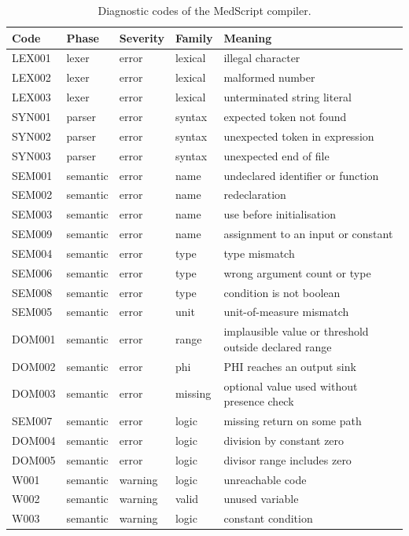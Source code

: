 \documentclass[conference]{IEEEtran}
\begin{document}
\begin{table}[t]
\centering
\caption{Diagnostic codes of the MedScript compiler.}\label{tab:diagcat}
\scriptsize
\begin{tabular}{llllp{6.3cm}}
\toprule
\textbf{Code} & \textbf{Phase} & \textbf{Severity} & \textbf{Family} & \textbf{Meaning}\\
\midrule
LEX001 & lexer & error & lexical & illegal character\\
LEX002 & lexer & error & lexical & malformed number\\
LEX003 & lexer & error & lexical & unterminated string literal\\
SYN001 & parser & error & syntax & expected token not found\\
SYN002 & parser & error & syntax & unexpected token in expression\\
SYN003 & parser & error & syntax & unexpected end of file\\
SEM001 & semantic & error & name & undeclared identifier or function\\
SEM002 & semantic & error & name & redeclaration\\
SEM003 & semantic & error & name & use before initialisation\\
SEM009 & semantic & error & name & assignment to an input or constant\\
SEM004 & semantic & error & type & type mismatch\\
SEM006 & semantic & error & type & wrong argument count or type\\
SEM008 & semantic & error & type & condition is not boolean\\
SEM005 & semantic & error & unit & unit-of-measure mismatch\\
DOM001 & semantic & error & range & implausible value or threshold outside declared range\\
DOM002 & semantic & error & phi & PHI reaches an output sink\\
DOM003 & semantic & error & missing & optional value used without presence check\\
SEM007 & semantic & error & logic & missing return on some path\\
DOM004 & semantic & error & logic & division by constant zero\\
DOM005 & semantic & error & logic & divisor range includes zero\\
W001 & semantic & warning & logic & unreachable code\\
W002 & semantic & warning & valid & unused variable\\
W003 & semantic & warning & logic & constant condition\\
\bottomrule
\end{tabular}
\end{table}
\end{document}
